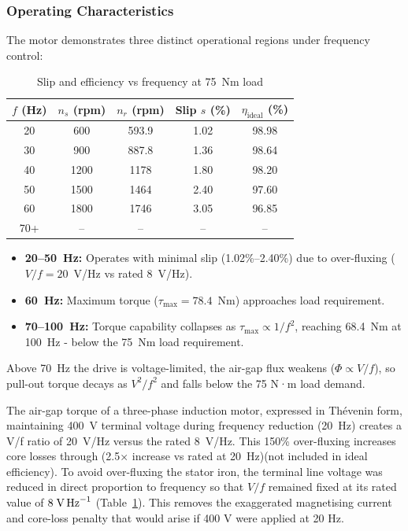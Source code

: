 \documentclass[a4paper,11pt]{IEEEtran}
\begin{document}
\subsubsection*{Operating Characteristics}
The motor demonstrates three distinct operational regions under frequency control:
\begin{table}[H]
    \centering
    \caption{Slip and efficiency vs frequency at 75~N\textperiodcentered m load}
    \begin{tabular}{|c|c|c|c|c|}
        \hline
        $f$ (Hz) & $n_s$ (rpm) & $n_r$ (rpm) & Slip $s$ (\%) & $\eta_{\text{ideal}}$ (\%) \\
        \hline
        20 & 600 & 593.9 & 1.02 & 98.98 \\
        30 & 900 & 887.8 & 1.36 & 98.64 \\
        40 & 1200 & 1178 & 1.80 & 98.20 \\
        50 & 1500 & 1464 & 2.40 & 97.60 \\
        60 & 1800 & 1746 & 3.05 & 96.85 \\
        70+ & -- & -- & -- & -- \\
        \hline
    \end{tabular}
    \label{tab:slip_eff_freq}
\end{table}
\begin{itemize}
    \item \textbf{20--50~Hz:} Operates with minimal slip (1.02\%--2.40\%) due to over-fluxing ($V/f = 20$~V/Hz vs rated 8~V/Hz).
    
     \item \textbf{60~Hz:} Maximum torque ($\tau_{\text{max}} = 78.4$~N\textperiodcentered m) approaches load requirement. 
    
    \item \textbf{70--100~Hz:} Torque capability collapses as $\tau_{\text{max}} \propto 1/f^2$, reaching 68.4~N\textperiodcentered m at 100~Hz - below the 75~N\textperiodcentered m load requirement.
\end{itemize}

Above 70~Hz the drive is voltage-limited, the air-gap flux weakens ($\Phi \propto V/f$), so pull-out torque decays as $V^{2}/f^{2}$ and falls below the 75 N·m load demand.

The air-gap torque of a three-phase induction motor, expressed in Thévenin form, maintaining 400~V terminal voltage during frequency reduction (20~Hz) creates a V/f ratio of 20~V/Hz versus the rated 8~V/Hz. This 150\% over-fluxing increases core losses through (2.5× increase vs rated at 20~Hz)(not included in ideal efficiency). To avoid over-fluxing the stator iron, the terminal line voltage was reduced in direct proportion to frequency so that $V/f$ remained fixed at its rated value of $8\;\text{V\,Hz}^{-1}$ (Table~\ref{tab:slip_eff_freq}).  This removes the exaggerated magnetising current and core-loss penalty that would arise if 400 V were applied at 20 Hz.
 
\end{document}
